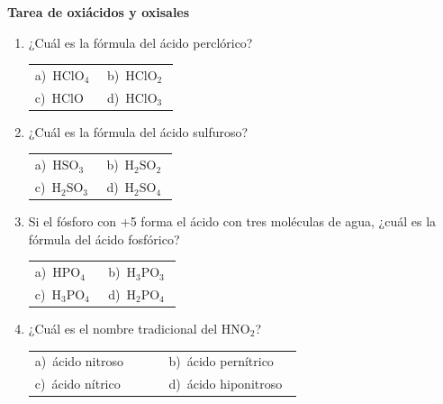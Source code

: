 \documentclass[11pt,a4paper]{article}
\begin{document}
{\Large\bfseries Tarea de oxiácidos y oxisales}
\vspace{12pt}
\begin{enumerate}[label=\textbf{\arabic*.},leftmargin=*,itemsep=11pt,topsep=0pt]
\item \begin{minipage}[t]{\linewidth}
¿Cuál es la fórmula del ácido perclórico?

\vspace{5pt}
\begin{tabular}{@{}p{0.47\linewidth}p{0.47\linewidth}@{}}
a)~$\mathrm{HClO_{4}}$ & b)~$\mathrm{HClO_{2}}$ \\
c)~HClO & d)~$\mathrm{HClO_{3}}$ \\
\end{tabular}
\end{minipage}

\item \begin{minipage}[t]{\linewidth}
¿Cuál es la fórmula del ácido sulfuroso?

\vspace{5pt}
\begin{tabular}{@{}p{0.47\linewidth}p{0.47\linewidth}@{}}
a)~$\mathrm{HSO_{3}}$ & b)~$\mathrm{H_{2}SO_{2}}$ \\
c)~$\mathrm{H_{2}SO_{3}}$ & d)~$\mathrm{H_{2}SO_{4}}$ \\
\end{tabular}
\end{minipage}

\item \begin{minipage}[t]{\linewidth}
Si el fósforo con +5 forma el ácido con tres moléculas de agua, ¿cuál es la fórmula del ácido fosfórico?

\vspace{5pt}
\begin{tabular}{@{}p{0.47\linewidth}p{0.47\linewidth}@{}}
a)~$\mathrm{HPO_{4}}$ & b)~$\mathrm{H_{3}PO_{3}}$ \\
c)~$\mathrm{H_{3}PO_{4}}$ & d)~$\mathrm{H_{2}PO_{4}}$ \\
\end{tabular}
\end{minipage}

\item \begin{minipage}[t]{\linewidth}
¿Cuál es el nombre tradicional del $\mathrm{HNO_{2}}$?

\vspace{5pt}
\begin{tabular}{@{}p{0.47\linewidth}p{0.47\linewidth}@{}}
a)~ácido nitroso & b)~ácido pernítrico \\
c)~ácido nítrico & d)~ácido hiponitroso \\
\end{tabular}
\end{minipage}


\end{enumerate}
\end{document}
